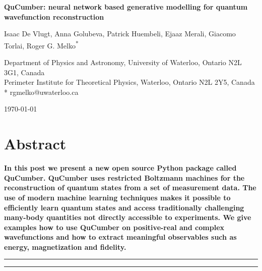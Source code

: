 \documentclass[submission, Phys]{SciPost}
\begin{document}
\begin{center}{\Large \textbf{
QuCumber: neural network based generative modelling for quantum wavefunction reconstruction
}}\end{center}

\begin{center}
Isaac De Vlugt,
Anna Golubeva,
Patrick Huembeli,
Ejaaz Merali,
Giacomo Torlai,
Roger G. Melko\textsuperscript{*}
\end{center}

\begin{center}
Department of Physics and Astronomy, University of Waterloo, Ontario N2L 3G1, Canada
\\
Perimeter Institute for Theoretical Physics, Waterloo, Ontario N2L 2Y5, Canada
* rgmelko@uwaterloo.ca
\end{center}

\begin{center}
\today
\end{center}


\section*{Abstract}
{\bf
In this post we present a new open source Python package called QuCumber.  QuCumber uses restricted Boltzmann machines 
for the reconstruction of quantum states from a set of measurement data. The use of modern machine learning techniques makes it possible to efficiently learn quantum states and access traditionally challenging many-body quantities not directly accessible to experiments. We give examples how to use QuCumber on positive-real and complex wavefunctions and how to extract meaningful observables such as energy, magnetization and fidelity.
}


\vspace{10pt}
\noindent\rule{\textwidth}{1pt}
\tableofcontents\thispagestyle{fancy}
\noindent\rule{\textwidth}{1pt}
\vspace{10pt}
\end{document}
